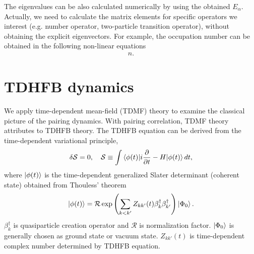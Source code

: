 \documentclass[11pt]{book} %
\begin{document}
The eigenvalues can be also calculated numerically by using the obtained $E_{\alpha}$. Actually, we need to calculate the matrix elements for specific operators we interest (e.g. number operator, two-particle transition operator), without obtaining the explicit eigenvectors. For example, the occupation number can be obtained in the following non-linear equations
\begin{align}
n.
\end{align}

\section{TDHFB dynamics}
We apply time-dependent mean-field (TDMF) theory to examine the classical picture of the pairing dynamics. With pairing correlation, TDMF theory attributes to TDHFB theory.
The TDHFB equation can be derived from the time-dependent variational principle,
\begin{equation}
  \delta\mathcal{S}=0, \quad 
  \mathcal{S} \equiv \int \braket{\phi(t)|i\frac{\partial}{\partial t}-H|\phi(t)}dt ,
  \label{variation}
\end{equation}
where $\ket{\phi(t)}$ is the time-dependent generalized Slater determinant (coherent state) obtained from Thouless' theorem
\begin{equation}
  \ket{\phi(t)} = \mathcal{R}\exp{\left( \sum_{k<k'}Z_{kk'}(t)\beta_k^{\dag}\beta_{k'}^{\dag}
    \right)}\ket{\Phi_0} .
\end{equation}
$\beta_k^{\dag}$ is quasiparticle creation operator and $\mathcal{R}$ is normalization factor. $\ket{\Phi_0}$ is generally chosen as ground state or vacuum state. $Z_{kk'}(t)$ is time-dependent complex number determined by TDHFB equation.
\end{document}
